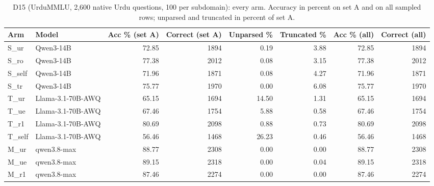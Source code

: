 \begin{table}[t]
\centering
\small
\caption{D15 (UrduMMLU, 2,600 native Urdu questions, 100 per subdomain): every arm. Accuracy in percent on set A and on all sampled rows; unparsed and truncated in percent of set A.}
\label{tab:d15-arms}
\begin{tabular}{llrrrrrr}
\toprule
Arm & Model & Acc \% (set A) & Correct (set A) & Unparsed \% & Truncated \% & Acc \% (all) & Correct (all) \\
\midrule
S\_ur & Qwen3-14B & 72.85 & 1894 & 0.19 & 3.88 & 72.85 & 1894 \\
S\_ro & Qwen3-14B & 77.38 & 2012 & 0.08 & 3.15 & 77.38 & 2012 \\
S\_self & Qwen3-14B & 71.96 & 1871 & 0.08 & 4.27 & 71.96 & 1871 \\
S\_tr & Qwen3-14B & 75.77 & 1970 & 0.00 & 6.08 & 75.77 & 1970 \\
T\_ur & Llama-3.1-70B-AWQ & 65.15 & 1694 & 14.50 & 1.31 & 65.15 & 1694 \\
T\_ue & Llama-3.1-70B-AWQ & 67.46 & 1754 & 5.88 & 0.58 & 67.46 & 1754 \\
T\_r1 & Llama-3.1-70B-AWQ & 80.69 & 2098 & 0.88 & 0.73 & 80.69 & 2098 \\
T\_self & Llama-3.1-70B-AWQ & 56.46 & 1468 & 26.23 & 0.46 & 56.46 & 1468 \\
M\_ur & qwen3.8-max & 88.77 & 2308 & 0.00 & 0.00 & 88.77 & 2308 \\
M\_ue & qwen3.8-max & 89.15 & 2318 & 0.00 & 0.04 & 89.15 & 2318 \\
M\_r1 & qwen3.8-max & 87.46 & 2274 & 0.00 & 0.00 & 87.46 & 2274 \\
\bottomrule
\end{tabular}
\end{table}
